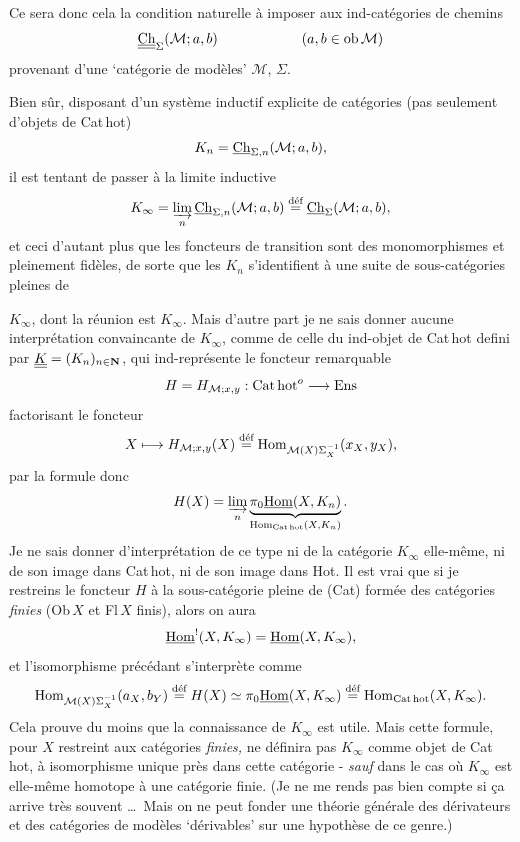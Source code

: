 Ce sera donc cela la condition naturelle à imposer aux ind-catégories de chemins
\[
\Chh_{\Sigma}(\mathcal{M};a,b) \qquad\qquad\qquad (a,b \in \mathrm{ob}\,\mathcal{M})
\]
provenant d'une `catégorie de modèles' $\mathcal{M}$, $\Sigma$.

Bien sûr, disposant d'un système inductif explicite de catégories (pas seulement d'objets de Cat\,hot)
\[
K_n = \Ch_{\Sigma,n}(\mathcal{M};a,b),
\]
il est tentant de passer à la limite inductive
\[
K_\infty = \varinjlim_n \Ch_{\Sigma,n}(\mathcal{M};a,b) \overset{\text{déf}}{=} \Ch_{\Sigma}(\mathcal{M};a,b),
\]
et ceci d'autant plus que les foncteurs de transition sont des monomorphismes et pleinement fidèles, de sorte que les $K_n$ s'identifient à une suite de sous-catégories pleines de

$K_\infty$, dont la réunion est $K_\infty$. Mais d'autre part je ne sais donner aucune interprétation convaincante de $K_\infty$, comme de celle du ind-objet de Cat\,hot defini par $\uuK = (K_n)_{n\in\mathbf{N}}$, qui ind-représente le foncteur remarquable %
\[
H = H_{\mathcal{M};x,y} : \Cathot^{o} \longrightarrow \Ens
\]
factorisant le foncteur
\[
X \longmapsto H_{\mathcal{M};x,y}(X) \defeq \Hom_{\mathcal{M}(X)\Sigma_X^{-1}}(x_X, y_X),
\]
par la formule donc
\[
H(X) = \varinjlim_{n} \underbrace{\pi_0\uHom(X, K_n)}_{\Hom_{\Cathot}(X,K_n)} .
\]
Je ne sais donner d'interprétation de ce type ni de la catégorie $K_\infty$ elle-même, ni de son image dans Cat\,hot, ni de son image dans Hot. Il est vrai que si je restreins le foncteur $H$ à la sous-catégorie pleine de (Cat) formée des catégories \textit{finies} (Ob\,$X$ et Fl\,$X$ finis), alors on aura
\[
\uHom^{!}(X, K_\infty) = \uHom(X, K_\infty),
\]
et l'isomorphisme précédant s'interprète comme %
\[
\Hom_{\mathcal{M}(X)\Sigma_X^{-1}}(a_X, b_Y) \defeq H(X) \simeq \pi_0\uHom(X, K_\infty) \defeq \Hom_{\Cathot}(X, K_\infty).
\]
 Cela prouve du moins que la connaissance de $K_\infty$ est utile. Mais cette formule, pour $X$ restreint aux catégories \textit{finies,} ne définira pas $K_\infty$ comme objet de Cat\,hot, à isomorphisme unique près dans cette catégorie - \textit{sauf} dans le cas où $K_\infty$ est elle-même homotope à une catégorie
finie. (Je ne me rends pas bien compte si ça arrive très souvent \ldots\ Mais on ne peut fonder une théorie générale des dérivateurs et des catégories de modèles `dérivables' sur une hypothèse de ce genre.)

